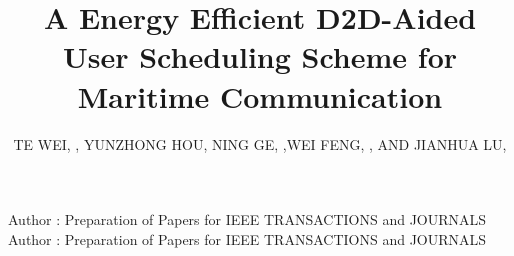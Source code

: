 \documentclass{ieeeaccess}
\begin{document}

\title{A Energy Efficient D2D-Aided User Scheduling Scheme for Maritime Communication}

\author{\uppercase{Te Wei}, ,
\uppercase{Yunzhong Hou}, \uppercase{Ning Ge},
,\uppercase{Wei Feng},
, \uppercase{and Jianhua Lu},
}
\address[1]{National Institute of Standards and 
Technology, Boulder, CO 80305 USA (e-mail: author@boulder.nist.gov)}
\address[2]{Department of Physics, Colorado State University, Fort Collins, 
CO 80523 USA (e-mail: author@lamar.colostate.edu)}
\address[3]{Electrical Engineering Department, University of Colorado, Boulder, CO 
80309 USA}
\address[4]{Electrical Engineering Department, University of Colorado, Boulder, CO 
80309 USA}
\address[5]{Electrical Engineering Department, University of Colorado, Boulder, CO 
80309 USA}


\markboth
{Author \headeretal: Preparation of Papers for IEEE TRANSACTIONS and JOURNALS}
{Author \headeretal: Preparation of Papers for IEEE TRANSACTIONS and JOURNALS}

\end{document}
